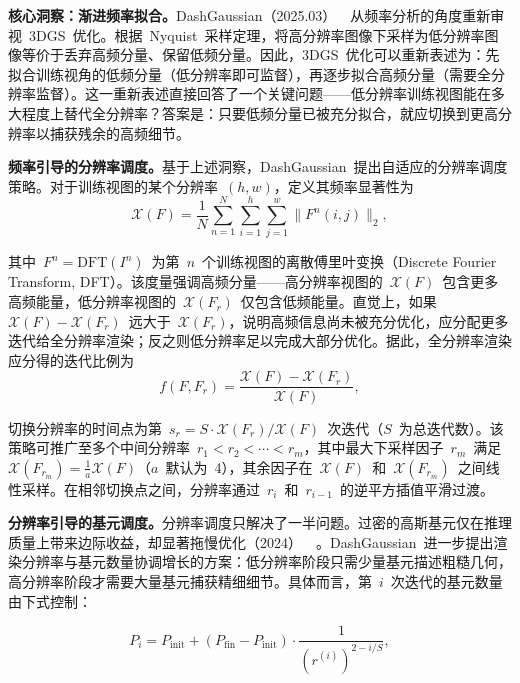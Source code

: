 \textbf{核心洞察：渐进频率拟合。}DashGaussian（2025.03）~\cite{2503_18402}~从频率分析的角度重新审视~3DGS~优化。根据~Nyquist~采样定理，将高分辨率图像下采样为低分辨率图像等价于丢弃高频分量、保留低频分量。因此，3DGS~优化可以重新表述为：先拟合训练视角的低频分量（低分辨率即可监督），再逐步拟合高频分量（需要全分辨率监督）。这一重新表述直接回答了一个关键问题——低分辨率训练视图能在多大程度上替代全分辨率？答案是：只要低频分量已被充分拟合，就应切换到更高分辨率以捕获残余的高频细节。

\textbf{频率引导的分辨率调度。}基于上述洞察，DashGaussian~提出自适应的分辨率调度策略。对于训练视图的某个分辨率~$(h, w)$，定义其频率显著性为
\begin{equation}
    \mathcal{X}(F) = \frac{1}{N} \sum_{n=1}^{N} \sum_{i=1}^{h} \sum_{j=1}^{w} \|F^n(i,j)\|_2,
\end{equation}

其中~$F^n = \mathrm{DFT}(I^n)$~为第~$n$~个训练视图的离散傅里叶变换（Discrete Fourier Transform, DFT）。该度量强调高频分量——高分辨率视图的~$\mathcal{X}(F)$~包含更多高频能量，低分辨率视图的~$\mathcal{X}(F_r)$~仅包含低频能量。直觉上，如果~$\mathcal{X}(F) - \mathcal{X}(F_r)$~远大于~$\mathcal{X}(F_r)$，说明高频信息尚未被充分优化，应分配更多迭代给全分辨率渲染；反之则低分辨率足以完成大部分优化。据此，全分辨率渲染应分得的迭代比例为
\begin{equation}
    f(F, F_r) = \frac{\mathcal{X}(F) - \mathcal{X}(F_r)}{\mathcal{X}(F)},
\end{equation}

切换分辨率的时间点为第~$s_r = S \cdot \mathcal{X}(F_r) / \mathcal{X}(F)$~次迭代（$S$~为总迭代数）。该策略可推广至多个中间分辨率~$r_1 < r_2 < \cdots < r_m$，其中最大下采样因子~$r_m$~满足~$\mathcal{X}(F_{r_m}) = \frac{1}{a}\mathcal{X}(F)$（$a$~默认为~4），其余因子在~$\mathcal{X}(F)$~和~$\mathcal{X}(F_{r_m})$~之间线性采样。在相邻切换点之间，分辨率通过~$r_i$~和~$r_{i-1}$~的逆平方插值平滑过渡。

\textbf{分辨率引导的基元调度。}分辨率调度只解决了一半问题。过密的高斯基元仅在推理质量上带来边际收益，却显著拖慢优化（2024）~\cite{fang2024minisplattingrepresentingscenesconstrained}~。DashGaussian~进一步提出渲染分辨率与基元数量协调增长的方案：低分辨率阶段只需少量基元描述粗糙几何，高分辨率阶段才需要大量基元捕获精细细节。具体而言，第~$i$~次迭代的基元数量由下式控制：

\begin{equation}
    P_i = P_{\text{init}} + (P_{\text{fin}} - P_{\text{init}}) \cdot \frac{1}{(r^{(i)})^{2 - i/S}},
\end{equation}

